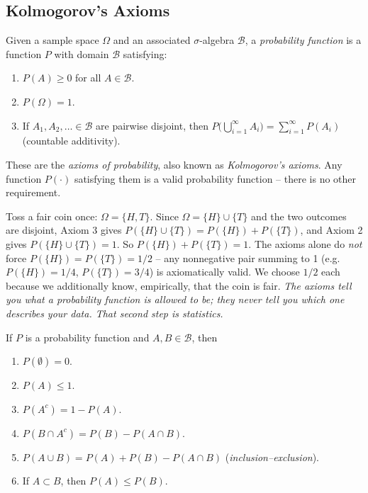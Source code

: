 \documentclass[11pt]{article}
\begin{document}
\subsection{Kolmogorov's Axioms}

\begin{definition}
Given a sample space $\Omega$ and an associated $\sigma$-algebra
$\mathcal{B}$, a \emph{probability function} is a function $P$ with domain
$\mathcal{B}$ satisfying:
\begin{enumerate}
  \item $P(A) \ge 0$ for all $A \in \mathcal{B}$.
  \item $P(\Omega) = 1$.
  \item If $A_1, A_2, \dots \in \mathcal{B}$ are pairwise disjoint, then
        $P\big(\bigcup_{i=1}^\infty A_i\big) = \sum_{i=1}^\infty P(A_i)$
        (countable additivity).
\end{enumerate}
These are the \emph{axioms of probability}, also known as \emph{Kolmogorov's
axioms}. Any function $P(\cdot)$ satisfying them is a valid probability
function -- there is no other requirement.
\end{definition}

\begin{example}
Toss a fair coin once: $\Omega = \{H, T\}$. Since $\Omega = \{H\} \cup \{T\}$
and the two outcomes are disjoint, Axiom 3 gives
$P(\{H\} \cup \{T\}) = P(\{H\}) + P(\{T\})$, and Axiom 2 gives
$P(\{H\} \cup \{T\}) = 1$. So $P(\{H\}) + P(\{T\}) = 1$. The axioms alone do
\emph{not} force $P(\{H\}) = P(\{T\}) = 1/2$ -- any nonnegative pair summing
to 1 (e.g.\ $P(\{H\}) = 1/4$, $P(\{T\}) = 3/4$) is axiomatically valid. We
choose $1/2$ each because we additionally know, empirically, that the coin is
fair. \emph{The axioms tell you what a probability function is allowed to be;
they never tell you which one describes your data. That second step is
statistics.}
\end{example}

\begin{theorem}
If $P$ is a probability function and $A, B \in \mathcal{B}$, then
\begin{enumerate}
  \item $P(\emptyset) = 0$.
  \item $P(A) \le 1$.
  \item $P(A^c) = 1 - P(A)$.
  \item $P(B \cap A^c) = P(B) - P(A \cap B)$.
  \item $P(A \cup B) = P(A) + P(B) - P(A \cap B)$ \quad
        (\emph{inclusion--exclusion}).
  \item If $A \subset B$, then $P(A) \le P(B)$.
\end{enumerate}
\end{theorem}
\end{document}

